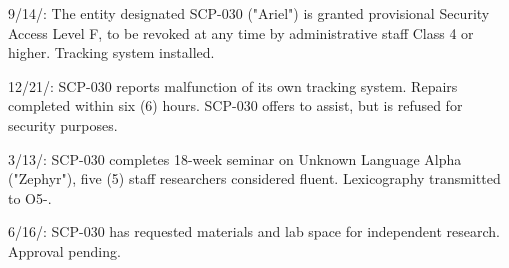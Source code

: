 9/14/: The entity designated SCP-030 ("Ariel") is granted provisional Security Access Level F, to be revoked at any time by administrative staff Class 4 or higher. Tracking system installed.

12/21/: SCP-030 reports malfunction of its own tracking system. Repairs completed within six (6) hours. SCP-030 offers to assist, but is refused for security purposes.

3/13/: SCP-030 completes 18-week seminar on Unknown Language Alpha ("Zephyr"), five (5) staff researchers considered fluent. Lexicography transmitted to O5-.

6/16/: SCP-030 has requested materials and lab space for independent research. Approval pending.